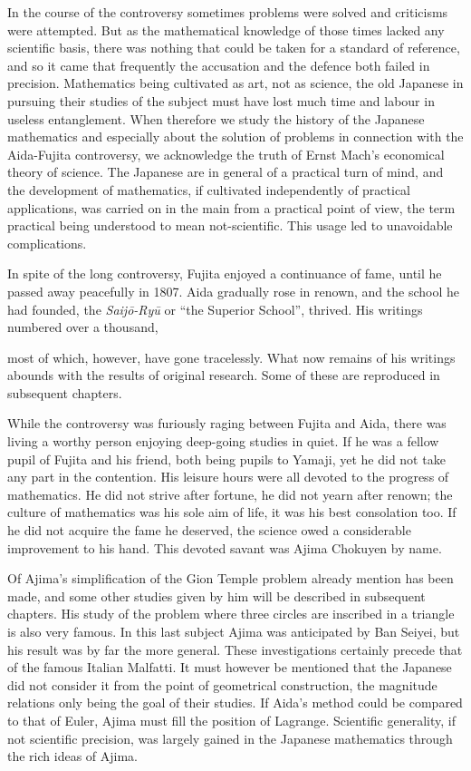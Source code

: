 \documentclass[11pt]{article}
\newcommand{\scanpage}[2]{\clearpage\setcounter{footnote}{0}\noindent{\footnotesize\color{gray}PDF page #1 · #2}\par\medskip}
\newcommand{\scanfooter}{}
\begin{document}
In the course of the controversy sometimes problems were solved and criticisms were attempted. But as the mathematical knowledge of those times lacked any scientific basis, there was nothing that could be taken for a standard of reference, and so it came that frequently the accusation and the defence both failed in precision. Mathematics being cultivated as art, not as science, the old Japanese in pursuing their studies of the subject must have lost much time and labour in useless entanglement. When therefore we study the history of the Japanese mathematics and especially about the solution of problems in connection with the Aida-Fujita controversy, we acknowledge the truth of Ernst Mach's economical theory of science. The Japanese are in general of a practical turn of mind, and the development of mathematics, if cultivated independently of practical applications, was carried on in the main from a practical point of view, the term practical being understood to mean not-scientific. This usage led to unavoidable complications.

In spite of the long controversy, Fujita enjoyed a continuance of fame, until he passed away peacefully in 1807. Aida gradually rose in renown, and the school he had founded, the \emph{Saijō-Ryū} or ``the Superior School'', thrived. His writings numbered over a thousand,
\scanfooter

\scanpage{0184}{Chapter 22, printed page 170}
most of which, however, have gone tracelessly. What now remains of his writings abounds with the results of original research. Some of these are reproduced in subsequent chapters.

While the controversy was furiously raging between Fujita and Aida, there was living a worthy person enjoying deep-going studies in quiet. If he was a fellow pupil of Fujita and his friend, both being pupils to Yamaji, yet he did not take any part in the contention. His leisure hours were all devoted to the progress of mathematics. He did not strive after fortune, he did not yearn after renown; the culture of mathematics was his sole aim of life, it was his best consolation too. If he did not acquire the fame he deserved, the science owed a considerable improvement to his hand. This devoted savant was Ajima Chokuyen by name.

Of Ajima's simplification of the Gion Temple problem already mention has been made, and some other studies given by him will be described in subsequent chapters. His study of the problem where three circles are inscribed in a triangle is also very famous. In this last subject Ajima was anticipated by Ban Seiyei, but his result was by far the more general. These investigations certainly precede that of the famous Italian Malfatti. It must however be mentioned that the Japanese did not consider it from the point of geometrical construction, the magnitude relations only being the goal of their studies. If Aida's method could be compared to that of Euler, Ajima must fill the position of Lagrange. Scientific generality, if not scientific precision, was largely gained in the Japanese mathematics through the rich ideas of Ajima.
\end{document}
